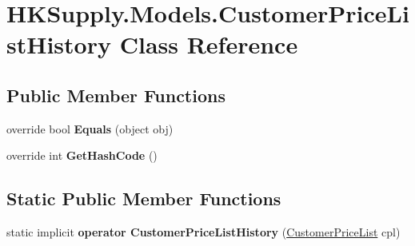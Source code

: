 \hypertarget{class_h_k_supply_1_1_models_1_1_customer_price_list_history}{}\section{H\+K\+Supply.\+Models.\+Customer\+Price\+List\+History Class Reference}
\label{class_h_k_supply_1_1_models_1_1_customer_price_list_history}
\subsection*{Public Member Functions}
\begin{DoxyCompactItemize}
\item 
\mbox{\label{class_h_k_supply_1_1_models_1_1_customer_price_list_history_a10551b326df133d397f609642f184af6}} 
override bool {\bfseries Equals} (object obj)
\item 
\mbox{\label{class_h_k_supply_1_1_models_1_1_customer_price_list_history_a400c81b0e0ff4549cdbcfb2143401ee8}} 
override int {\bfseries Get\+Hash\+Code} ()
\end{DoxyCompactItemize}
\subsection*{Static Public Member Functions}
\begin{DoxyCompactItemize}
\item 
\mbox{\label{class_h_k_supply_1_1_models_1_1_customer_price_list_history_a202b7efbf4a790367ff3c5853d039d9a}} 
static implicit {\bfseries operator Customer\+Price\+List\+History} (\mbox{\hyperlink{class_h_k_supply_1_1_models_1_1_customer_price_list}{Customer\+Price\+List}} cpl)
\end{DoxyCompactItemize}
